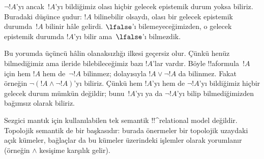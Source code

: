 $\lnot !A$'yı ancak~$!A$'yı bildiğimiz olası hiçbir gelecek epistemik durum
yoksa biliriz. Buradaki düşünce şudur: $!A$ bilinebilir olsaydı, olası bir
gelecek epistemik durumda~$!A$ bilinir hâle gelirdi. $\lfalse$'ı
bilemeyeceğimizden, o gelecek epistemik durumda $!A$'yı bilir ama~$\lfalse$'ı
bilmezdik.

Bu yorumda üçüncü hâlin olanaksızlığı ilkesi geçersiz olur. Çünkü henüz
bilmediğimiz ama ileride bilebileceğimiz bazı $!A$'lar vardır. Böyle
!!a{formula}~$!A$ için hem $!A$ hem de~$\lnot !A$ bilinmez; dolayısıyla $!A
\lor \lnot !A$ da bilinmez. Fakat örneğin $\lnot(!A \land \lnot !A)$'yı
biliriz. Çünkü hem $!A$'yı hem de $\lnot !A$'yı bildiğimiz hiçbir gelecek durum
mümkün değildir; bunu~$!A$'yı ya da $\lnot !A$'yı bilip bilmediğimizden
bağımsız olarak biliriz.

Sezgici mantık için kullanılabilen tek semantik !!^{relational model}
değildir. Topolojik semantik de bir başkasıdır: burada önermeler bir topolojik
uzaydaki açık kümeler, bağlaçlar da bu kümeler üzerindeki işlemler olarak
yorumlanır (örneğin $\land$ kesişime karşılık gelir).

